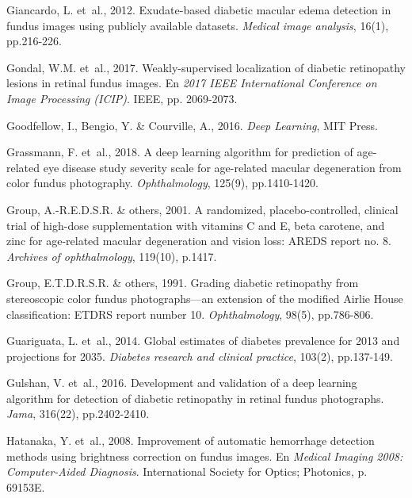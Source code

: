 \documentclass[
  12pt,
  spanish,
  a4paperpaper,
]{report}
\begin{document}
\leavevmode\hypertarget{ref-giancardo2012exudate}{}%
Giancardo, L. et~al., 2012. Exudate-based diabetic macular edema
detection in fundus images using publicly available datasets.
\emph{Medical image analysis}, 16(1), pp.216-226.

\leavevmode\hypertarget{ref-gondal2017weakly}{}%
Gondal, W.M. et~al., 2017. Weakly-supervised localization of diabetic
retinopathy lesions in retinal fundus images. En \emph{2017 IEEE
International Conference on Image Processing (ICIP)}. IEEE, pp.
2069-2073.

\leavevmode\hypertarget{ref-Goodfellow-et-al-2016}{}%
Goodfellow, I., Bengio, Y. \& Courville, A., 2016. \emph{Deep Learning},
MIT Press.

\leavevmode\hypertarget{ref-grassmann2018deep}{}%
Grassmann, F. et~al., 2018. A deep learning algorithm for prediction of
age-related eye disease study severity scale for age-related macular
degeneration from color fundus photography. \emph{Ophthalmology},
125(9), pp.1410-1420.

\leavevmode\hypertarget{ref-age2001randomized}{}%
Group, A.-R.E.D.S.R. \& others, 2001. A randomized, placebo-controlled,
clinical trial of high-dose supplementation with vitamins C and E, beta
carotene, and zinc for age-related macular degeneration and vision loss:
AREDS report no. 8. \emph{Archives of ophthalmology}, 119(10), p.1417.

\leavevmode\hypertarget{ref-early1991grading}{}%
Group, E.T.D.R.S.R. \& others, 1991. Grading diabetic retinopathy from
stereoscopic color fundus photographs---an extension of the modified
Airlie House classification: ETDRS report number 10.
\emph{Ophthalmology}, 98(5), pp.786-806.

\leavevmode\hypertarget{ref-guariguata2014global}{}%
Guariguata, L. et~al., 2014. Global estimates of diabetes prevalence for
2013 and projections for 2035. \emph{Diabetes research and clinical
practice}, 103(2), pp.137-149.

\leavevmode\hypertarget{ref-gulshan2016development}{}%
Gulshan, V. et~al., 2016. Development and validation of a deep learning
algorithm for detection of diabetic retinopathy in retinal fundus
photographs. \emph{Jama}, 316(22), pp.2402-2410.

\leavevmode\hypertarget{ref-hatanaka2008improvement}{}%
Hatanaka, Y. et~al., 2008. Improvement of automatic hemorrhage detection
methods using brightness correction on fundus images. En \emph{Medical
Imaging 2008: Computer-Aided Diagnosis}. International Society for
Optics; Photonics, p. 69153E.
\end{document}
